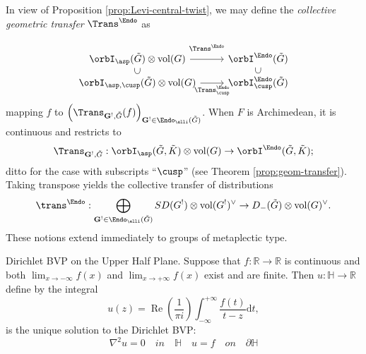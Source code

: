 \documentclass[12pt, a3paper, openany]{book}
\begin{document}
\begin{Definition}{}{}
	In view of Proposition \ref{prop:Levi-central-twist}, we may define the \emph{collective geometric transfer} $\Trans^{\Endo}$ as
	\begin{equation*}\begin{tikzcd}[row sep=tiny]
		\orbI_{\asp}(\tilde{G}) \otimes \mes(G) \arrow[r, "{\Trans^{\Endo}}" inner sep=0.8em] & \orbI^{\Endo}(\tilde{G}) \\
		\orbI_{\asp, \cusp}(\tilde{G}) \otimes \mes(G) \arrow[phantom, u, "\subset" description, sloped] \arrow[r, "{\Trans^{\Endo}_{\cusp}}"'] & \orbI^{\Endo}_{\cusp}(\tilde{G}) \arrow[phantom, u, "\subset" description, sloped]
	\end{tikzcd}\end{equation*}mapping $f$ to $\left( \Trans_{\mathbf{G}^!, \tilde{G}}(f)\right)_{\mathbf{G}^! \in \Endo_{\elli}(\tilde{G})}$. When $F$ is Archimedean, it is continuous and restricts to
	\[ \Trans_{\mathbf{G}^!, \tilde{G}}: \orbI_{\asp}(\tilde{G}, \tilde{K}) \otimes \mes(G) \to \orbI^{\Endo}(\tilde{G}, \tilde{K}); \]
	ditto for the case with subscripts ``$\cusp$'' (see Theorem \ref{prop:geom-transfer}).
	Taking transpose yields the collective transfer of distributions
	\[ \trans^{\Endo}: \bigoplus_{\mathbf{G}^! \in \Endo_{\elli}(\tilde{G})} SD(G^!) \otimes \mes(G^!)^\vee \to D_-(\tilde{G}) \otimes \mes(G)^\vee . \]
These notions extend immediately to groups of metaplectic type.
\end{Definition}

\begin{Proposition}{Dirichlet BVP on the Upper Half Plane.}{}
Suppose that $f: \mathbb{R} \rightarrow \mathbb{R}$ is continuous and both $\lim_{x \to -\infty} f(x) $ and $\lim_{x \to +\infty} f(x) $ exist and are finite. Then $u: \mathbb{H} \rightarrow \mathbb{R}$ define by the integral 
$$ u(z) = \operatorname{Re}(\frac{1}{\pi i}) \int_{-\infty}^{+\infty} \frac{f(t)}{t-z}\mathrm{d}t, $$ is the unique solution to the Dirichlet BVP:$$\nabla^{2}u=0 \quad in \quad \mathbb{H} \quad u=f \quad on \quad \partial \mathbb{H} $$
\end{Proposition}
\end{document}
